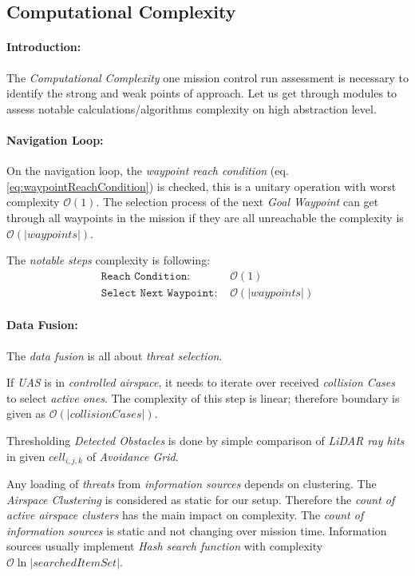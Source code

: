 \newpage
\subsection{Computational Complexity}\label{sec:MCRcomputationalComplexity}
\paragraph{Introduction:}The \emph{Computational Complexity} one mission control run assessment is necessary to identify the strong and weak points of approach. Let us get through modules to assess notable calculations/algorithms complexity on high abstraction level.

\paragraph{Navigation Loop:} On the navigation loop, the \emph{waypoint reach condition} (eq. \ref{eq:waypointReachCondition}) is checked, this is a unitary operation with worst complexity $\mathscr{O}(1)$. The selection process of the next \emph{Goal Waypoint} can get through all waypoints in the mission if they are all unreachable the complexity is $\mathscr{O}(|waypoints|)$.

The \emph{notable steps} complexity is following:
\begin{equation*}
    \begin{aligned}
        \texttt{Reach Condition: }& \mathscr{O}(1)\\
        \texttt{Select Next Waypoint: }&\mathscr{O}(|waypoints|)
    \end{aligned}
\end{equation*}

\paragraph{Data Fusion:} The \emph{data fusion} is all about \emph{threat selection}. 

If \emph{UAS} is in \emph{controlled airspace}, it needs to iterate over received \emph{collision Cases} to select \emph{active ones}. The complexity of this step is linear; therefore boundary is given as $\mathscr{O} (|collision Cases|)$.

Thresholding \emph{Detected Obstacles} is done by simple comparison of \emph{LiDAR ray hits} in given $cell_{i,j,k}$ of \emph{Avoidance Grid}.

Any loading of \emph{threats} from \emph{information sources} depends on clustering. The \emph{Airspace Clustering} is considered as static for our setup. Therefore the \emph{count of active airspace clusters} has the main impact on complexity. The \emph{count of information sources} is static and not changing over mission time. Information sources usually implement \emph{Hash search function} with complexity $\mathscr{O}\ln|searched Item Set|$.

